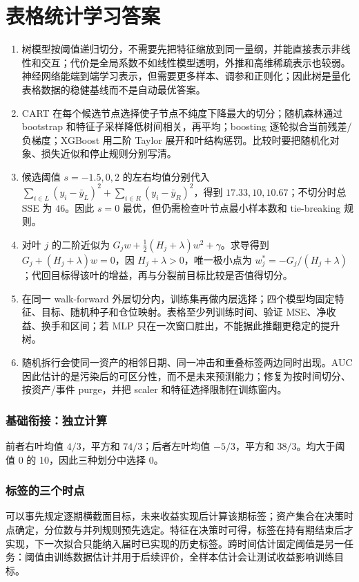 \chapter{表格统计学习答案}

\begin{enumerate}[leftmargin=*]
  \item 树模型按阈值递归切分，不需要先把特征缩放到同一量纲，并能直接表示非线性和交互；代价是全局系数不如线性模型透明，外推和高维稀疏表示也较弱。神经网络能端到端学习表示，但需要更多样本、调参和正则化；因此树是量化表格数据的稳健基线而不是自动最优答案。
  \item CART 在每个候选节点选择使子节点不纯度下降最大的切分；随机森林通过 bootstrap 和特征子采样降低树间相关，再平均；boosting 逐轮拟合当前残差/负梯度；XGBoost 用二阶 Taylor 展开和叶结构惩罚。比较时要把随机化对象、损失近似和停止规则分别写清。
  \item 候选阈值 $s=-1.5,0,2$ 的左右均值分别代入 $\sum_{i\in L}(y_i-\bar y_L)^2+\sum_{i\in R}(y_i-\bar y_R)^2$，得到 $17.33,10,10.67$；不切分时总 SSE 为 $46$。因此 $s=0$ 最优，但仍需检查叶节点最小样本数和 tie-breaking 规则。
  \item 对叶 $j$ 的二阶近似为 $G_jw+\frac12(H_j+\lambda)w^2+\gamma$。求导得到 $G_j+(H_j+\lambda)w=0$，因 $H_j+\lambda>0$，唯一极小点为 $w_j^*=-G_j/(H_j+\lambda)$；代回目标得该叶的增益，再与分裂前目标比较是否值得切分。
  \item 在同一 walk-forward 外层切分内，训练集再做内层选择；四个模型均固定特征、目标、随机种子和仓位映射。表格至少列训练时间、验证 MSE、净收益、换手和区间；若 MLP 只在一次窗口胜出，不能据此推翻更稳定的提升树。
  \item 随机拆行会使同一资产的相邻日期、同一冲击和重叠标签两边同时出现。AUC 因此估计的是污染后的可区分性，而不是未来预测能力；修复为按时间切分、按资产/事件 purge，并把 scaler 和特征选择限制在训练窗内。
\end{enumerate}

\subsection*{基础衔接：独立计算}
前者右叶均值 $4/3$，平方和 $74/3$；后者左叶均值 $-5/3$，平方和 $38/3$。均大于阈值 0 的 10，因此三种划分中选择 0。

\subsection*{标签的三个时点}
可以事先规定逐期横截面目标，未来收益实现后计算该期标签；资产集合在决策时点确定，分位数与并列规则预先选定。特征在决策时可得，标签在持有期结束后才实现，下一次拟合只能纳入届时已实现的历史标签。跨时间估计固定阈值是另一任务：阈值由训练数据估计并用于后续评价，全样本估计会让测试收益影响训练目标。

